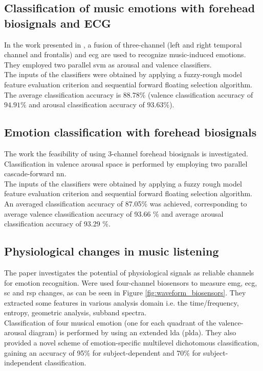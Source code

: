 \subsection{Classification of music emotions with  forehead biosignals and ECG}
In the work presented in \cite{naji2014classification}, a fusion of three-channel (left and right  temporal channel and frontalis) and \gls{ecg} are used to recognize music-induced emotions. They employed two parallel \gls{svm} as arousal and valence classifiers.
\\ \indent
The inputs of the classifiers were obtained by applying a fuzzy-rough model feature evaluation criterion and sequential forward floating selection algorithm.
\\
The average classification accuracy is $88.78\%$ (valence classification accuracy of $94.91\%$ and arousal classification accuracy of $93.63\%$).

\subsection{Emotion classification with forehead biosignals}
The work \cite{naji2015emotion} the feasibility of using 3-channel forehead biosignals is investigated. Classification in valence arousal space is performed by employing two parallel cascade-forward \gls{nn}.
\\
The inputs of the classifiers were obtained by applying a fuzzy rough model feature evaluation criterion and sequential forward floating selection algorithm. An averaged classification accuracy of 87.05\% was achieved, corresponding to average valence classification accuracy of 93.66 \% and average arousal classification accuracy of 93.29 \%.

\subsection{Physiological changes in music listening}
The paper \cite{kim2008emotion} investigates the potential of physiological signals as reliable channels for emotion recognition. Were used four-channel biosensors to measure \gls{emg}, \gls{ecg}, \gls{sc} and \gls{rsp} changes, as can be seen in Figure \ref{fig:waveform_biosensors}. They extracted some features in various analysis domain i.e. the time/frequency, entropy, geometric analysis, subband spectra.
\\ \indent
Classification of four musical emotion (one for each quadrant of the valence-arousal diagram) is performed by using an extended \gls{lda} (p\gls{lda}). They also provided a novel scheme of emotion-specific multilevel dichotomous classification, gaining an accuracy of 95\% for subject-dependent and 70\% for subject-independent classification.
 
